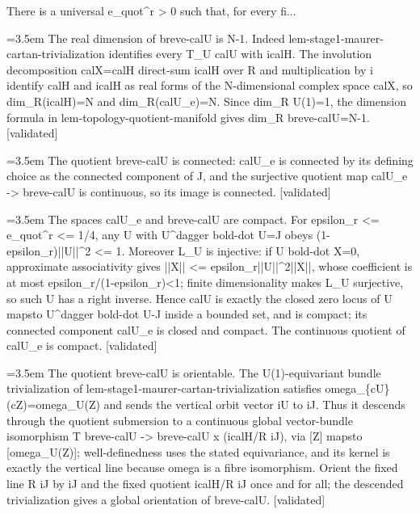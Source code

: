 \documentclass{article}
\newcommand{\step}[1]{\par\noindent\hangindent=3.5em\hangafter=1%
  \makebox[3.5em][l]{\textbf{#1.}}}
\newcommand{\steptag}[1]{\hfill{\small\textsf{[#1]}}}
\begin{document}
\begin{proofbox}{There is a universal e\_quot\textasciicircum{}r > 0 such that, for every fi...}
\step{1.5} The real dimension of breve-calU is N-1. Indeed lem-stage1-maurer-cartan-trivialization identifies every T\_U calU with icalH. The involution decomposition calX=calH direct-sum icalH over R and multiplication by i identify calH and icalH as real forms of the N-dimensional complex space calX, so dim\_R(icalH)=N and dim\_R(calU\_e)=N. Since dim\_R U(1)=1, the dimension formula in lem-topology-quotient-manifold gives dim\_R breve-calU=N-1. \steptag{validated} \\[4pt]
\step{1.6} The quotient breve-calU is connected: calU\_e is connected by its defining choice as the connected component of J, and the surjective quotient map calU\_e -> breve-calU is continuous, so its image is connected. \steptag{validated} \\[4pt]
\step{1.7} The spaces calU\_e and breve-calU are compact. For epsilon\_r <= e\_quot\textasciicircum{}r <= 1/4, any U with U\textasciicircum{}dagger bold-dot U=J obeys (1-epsilon\_r)||U||\textasciicircum{}2 <= 1. Moreover L\_U is injective: if U bold-dot X=0, approximate associativity gives ||X|| <= epsilon\_r||U||\textasciicircum{}2||X||, whose coefficient is at most epsilon\_r/(1-epsilon\_r)<1; finite dimensionality makes L\_U surjective, so such U has a right inverse. Hence calU is exactly the closed zero locus of U mapsto U\textasciicircum{}dagger bold-dot U-J inside a bounded set, and is compact; its connected component calU\_e is closed and compact. The continuous quotient of calU\_e is compact. \steptag{validated} \\[4pt]
\step{1.8} The quotient breve-calU is orientable. The U(1)-equivariant bundle trivialization of lem-stage1-maurer-cartan-trivialization satisfies omega\_\{cU\}(cZ)=omega\_U(Z) and sends the vertical orbit vector iU to iJ. Thus it descends through the quotient submersion to a continuous global vector-bundle isomorphism T breve-calU -> breve-calU x (icalH/R iJ), via [Z] mapsto [omega\_U(Z)]; well-definedness uses the stated equivariance, and its kernel is exactly the vertical line because omega is a fibre isomorphism. Orient the fixed line R iJ by iJ and the fixed quotient icalH/R iJ once and for all; the descended trivialization gives a global orientation of breve-calU. \steptag{validated} \\[4pt]
\end{proofbox}
\end{document}
